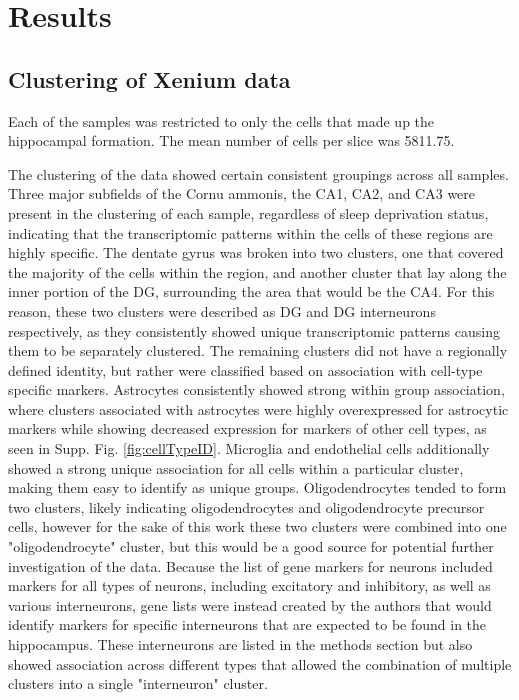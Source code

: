 \documentclass{article}
\begin{document}
\section{Results}

\subsection{Clustering of Xenium data}

Each of the samples was restricted to only the cells that made up the hippocampal formation. The mean number of cells per slice was 5811.75. 

The clustering of the data showed certain consistent groupings across all samples. Three major subfields of the Cornu ammonis, the CA1, CA2, and CA3 were present in the clustering of each sample, regardless of sleep deprivation status, indicating that the transcriptomic patterns within the cells of these regions are highly specific. The dentate gyrus was broken into two clusters, one that covered the majority of the cells within the region, and another cluster that lay along the inner portion of the DG, surrounding the area that would be the CA4. For this reason, these two clusters were described as DG and DG interneurons respectively, as they consistently showed unique transcriptomic patterns causing them to be separately clustered. The remaining clusters did not have a regionally defined identity, but rather were classified based on association with cell-type specific markers. Astrocytes consistently showed strong within group association, where clusters associated with astrocytes were highly overexpressed for astrocytic markers while showing decreased expression for markers of other cell types, as seen in Supp. Fig. \ref{fig:cellTypeID}. Microglia and endothelial cells additionally showed a strong unique association for all cells within a particular cluster, making them easy to identify as unique groups. Oligodendrocytes tended to form two clusters, likely indicating oligodendrocytes and oligodendrocyte precursor cells, however for the sake of this work these two clusters were combined into one "oligodendrocyte" cluster, but this would be a good source for potential further investigation of the data. Because the list of gene markers for neurons included markers for all types of neurons, including excitatory and inhibitory, as well as various interneurons, gene lists were instead created by the authors that would identify markers for specific interneurons that are expected to be found in the hippocampus. These interneurons are listed in the methods section but also showed association across different types that allowed the combination of multiple clusters into a single "interneuron" cluster. 
\end{document}
